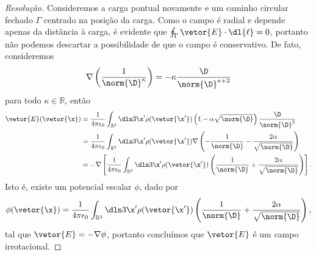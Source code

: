 \begin{proof}[Resolução]
    Consideremos a carga pontual novamente e um caminho circular fechado \(\Gamma\) centrado na posição da carga. Como o campo é radial e depende apenas da distância à carga, é evidente que \(\oint_{\Gamma} \vetor{E}\cdot\dl{\ell} = 0\), portanto não podemos descartar a possibilidade de que o campo é conservativo. De fato, consideremos
    \begin{equation*}
        \nabla\left(\frac{1}{\norm{\D}^\kappa}\right) = - \kappa\frac{\D}{\norm{\D}^{\kappa + 2}}
    \end{equation*}
    para todo \(\kappa \in \mathbb{R}\), então
    \begin{align*}
        \vetor{E}(\vetor{\x}) &= \frac{1}{4\pi \epsilon_0} \int_{\mathbb{R}^3} \dln3{\x'}\rho(\vetor{\x'})\left(1 - \alpha\sqrt{\norm{\D}} \right)\frac{\D}{\norm{\D}^3}\\
                              &= \frac{1}{4\pi \epsilon_0} \int_{\mathbb{R}^3} \dln3{\x'}\rho(\vetor{\x'})\nabla\left(-\frac{1}{\norm{\D}} - \frac{2\alpha}{\sqrt{\norm{\D}}} \right)\\
                              &= - \nabla\left[\frac{1}{4\pi \epsilon_0} \int_{\mathbb{R}^3} \dln3{\x'}\rho(\vetor{\x'})\left(\frac{1}{\norm{\D}} + \frac{2\alpha}{\sqrt{\norm{\D}}} \right)\right].
    \end{align*}
    Isto é, existe um potencial escalar \(\phi\), dado por
    \begin{equation*}
        \phi(\vetor{\x}) = \frac{1}{4\pi \epsilon_0} \int_{\mathbb{R}^3} \dln3{\x'}\rho(\vetor{\x'})\left(\frac{1}{\norm{\D}} + \frac{2\alpha}{\sqrt{\norm{\D}}} \right),
    \end{equation*}
    tal que \(\vetor{E} = -\nabla \phi\), portanto concluímos que \(\vetor{E}\) é um campo irrotacional.


\end{proof}
